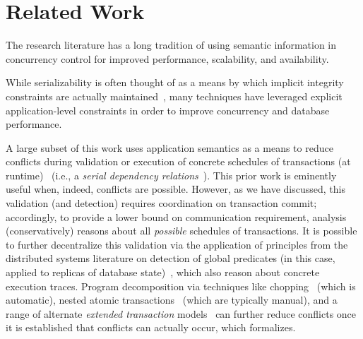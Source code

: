 
\section{Related Work}
\label{sec:relatedwork}

The research literature has a long tradition of using semantic
information in concurrency control for improved performance,
scalability, and availability.

 While serializability is
often thought of as a means by which implicit integrity constraints
are actually maintained~\cite{gray-virtues}, many techniques have
leveraged explicit application-level constraints in order to improve
concurrency and database performance.

A large subset of this work uses application semantics as a means to
reduce conflicts during validation or execution of concrete schedules
of transactions (at runtime)~\cite{weihl-thesis,badrinath-semantics}
(i.e., a \textit{serial dependency
  relations}~\cite{herlihy-apologizing}). This prior work is eminently
useful when, indeed, conflicts are possible. However, as we have
discussed, this validation (and detection) requires coordination on
transaction commit; accordingly, to provide a lower bound on
communication requirement, \iconfluence analysis (conservatively)
reasons about all \textit{possible} schedules of transactions.  It is
possible to further decentralize this validation via the application
of principles from the distributed systems literature on detection of
global predicates (in this case, applied to replicas of database
state)~\cite{globalpredicates}, which also reason about concrete
execution traces. Program decomposition via techniques like
chopping~\cite{chopping} (which is automatic), nested atomic
transactions~\cite{atomictransactions} (which are typically manual),
and a range of alternate \textit{extended transaction}
models~\cite{acta} can further reduce conflicts once it is established
that conflicts can actually occur, which \iconfluence formalizes.

